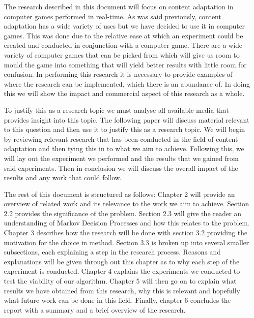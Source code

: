 \documentclass[11pt]{article}
\begin{document}
The research described in this document will focus on content adaptation in computer games performed in real-time. As was said previously, content adaptation has a wide variety of uses but we have decided to use it in computer games. This was done due to the relative ease at which an experiment could be created and conducted in conjunction with a computer game. There are a wide variety of computer games that can be picked from which will give us room to mould the game into something that will yield better results with little room for confusion. In performing this research it is necessary to provide examples of where the research can be implemented, which there is an abundance of. In doing this we will show the impact and commercial aspect of this research as a whole.
\vspace{4.0 mm}

To justify this as a research topic we must analyse all available media that provides insight into this topic. The following paper will discuss material relevant to this question and then use it to justify this as a research topic. We will begin by reviewing relevant research that has been conducted in the field of content adaptation and then tying this in to what we aim to achieve. Following this, we will lay out the experiment we performed and the results that we gained from said experiments. Then in conclusion we will discuss the overall impact of the results and any work that could follow.
\vspace{4.0 mm}

The rest of this document is structured as follows: Chapter 2 will provide an overview of related work and its relevance to the work we aim to achieve. Section 2.2 provides the significance of the problem. Section 2.3 will give the reader an understanding of Markov Decision Processes and how this relates to the problem. Chapter 3 describes how the research will be done with section 3.2 providing the motivation for the choice in method. Section 3.3 is broken up into several smaller subsections, each explaining a step in the research process. Reasons and explanations will be given through out this chapter as to why each step of the experiment is conducted. Chapter 4 explains the experiments we conducted to test the viability of our algorithm. Chapter 5 will then go on to explain what results we have obtained from this research, why this is relevant and hopefully what future work can be done in this field. Finally, chapter 6 concludes the report with a summary and a brief overview of the research.
\end{document}
